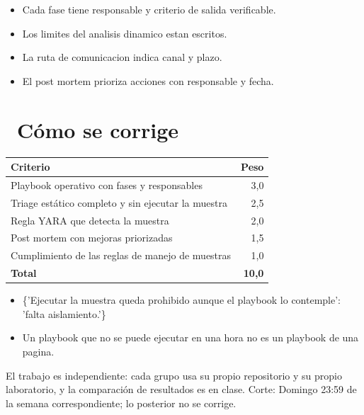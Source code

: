 \documentclass[11pt,a4paper]{article}
\newcommand{\iconotexto}[2]{\textcolor{cyanNeon}{\faIcon{#1}}~#2}
\begin{document}
\begin{itemize}[leftmargin=1.4em,itemsep=2pt,topsep=3pt]
  \item Cada fase tiene responsable y criterio de salida verificable.
  \item Los limites del analisis dinamico estan escritos.
  \item La ruta de comunicacion indica canal y plazo.
  \item El post mortem prioriza acciones con responsable y fecha.
\end{itemize}

\section{\iconotexto{ruler-combined}{Cómo se corrige}}

\begin{tabularx}{\linewidth}{@{}X r@{}}
\toprule
Criterio & Peso\\
\midrule
Playbook operativo con fases y responsables & 3,0 \\
Triage estático completo y sin ejecutar la muestra & 2,5 \\
Regla YARA que detecta la muestra & 2,0 \\
Post mortem con mejoras priorizadas & 1,5 \\
Cumplimiento de las reglas de manejo de muestras & 1,0 \\
\midrule
\textbf{Total} & \textbf{10,0}\\
\bottomrule
\end{tabularx}

\begin{itemize}[leftmargin=1.4em,itemsep=2pt,topsep=3pt]
  \item \{'Ejecutar la muestra queda prohibido aunque el playbook lo contemple': 'falta aislamiento.'\}
  \item Un playbook que no se puede ejecutar en una hora no es un playbook de una pagina.
\end{itemize}

\begin{cajaRecuerda}El trabajo es independiente: cada grupo usa su propio repositorio y su propio laboratorio, y la comparación de resultados es en clase. Corte: Domingo 23:59 de la semana correspondiente; lo posterior no se corrige.
\end{cajaRecuerda}
\end{document}

